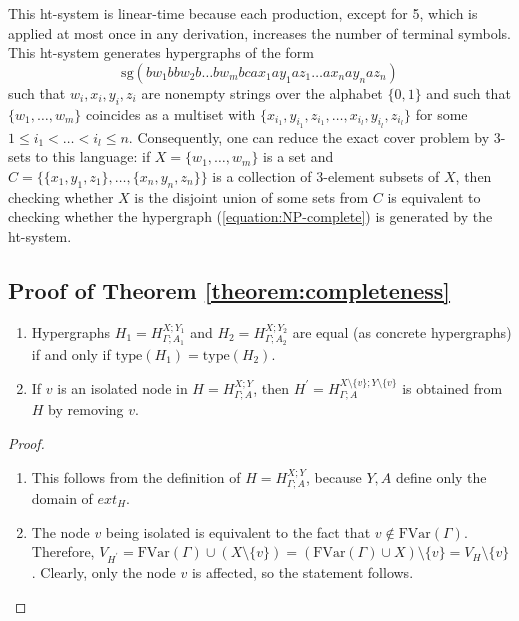 \documentclass[a4paper,UKenglish,cleveref, autoref, thm-restate,pdfa]{lipics-v2021}
\newcommand{\ext}{\mathit{ext}}
\newcommand{\type}{\mathrm{type}}
\newcommand{\SG}{\mathrm{sg}}
\newcommand{\FVar}{\mathrm{FVar}}
\begin{document}
	This ht-system is linear-time because each production, except for 5, which is applied at most once in any derivation, increases the number of terminal symbols. This ht-system generates hypergraphs of the form
	\begin{equation}\label{equation:NP-complete}
		\SG(bw_1b bw_2b \ldots bw_m b c a x_1 a y_1 a z_1 \ldots a x_n a y_n a z_n)
	\end{equation}
	such that $w_i,x_i,y_i,z_i$ are nonempty strings over the alphabet $\{0,1\}$ and such that $\{w_1,\ldots,w_m\}$ coincides as a multiset with $\{x_{i_1},y_{i_1},z_{i_1},\ldots,x_{i_l},y_{i_l},z_{i_l}\}$ for some $1 \le i_1 < \ldots < i_l \le n$. Consequently, one can reduce the exact cover problem by 3-sets to this language: if $X=\{w_1,\ldots,w_{m}\}$ is a set and $C = \{\{x_1,y_1,z_1\},\ldots,\{x_n,y_n,z_n\}\}$ is a collection of 3-element subsets of $X$, then checking whether $X$ is the disjoint union of some sets from $C$ is equivalent to checking whether the hypergraph (\ref{equation:NP-complete}) is generated by the ht-system.

\subsection{Proof of Theorem \ref{theorem:completeness}}\label{appendix:proof-theorem:completeness}

\begin{lemma}\label{lemma:properties-HXYGA}
	\leavevmode
	\begin{enumerate}
		\item Hypergraphs $H_1 = H^{X;Y_1}_{\Gamma;A_1}$ and $H_2 = H^{X;Y_2}_{\Gamma;A_2}$ are equal (as concrete hypergraphs) if and only if $\type(H_1) = \type(H_2)$.
		\item If $v$ is an isolated node in $H = H^{X;Y}_{\Gamma;A}$, then $H^\prime = H^{X\setminus\{v\};Y\setminus\{v\}}_{\Gamma;A}$ is obtained from $H$ by removing $v$.
	\end{enumerate}
\end{lemma}
\begin{proof}
	\begin{enumerate}
		\item This follows from the definition of $H = H^{X;Y}_{\Gamma;A}$, because $Y,A$ define only the domain of $\ext_H$.
		\item The node $v$ being isolated is equivalent to the fact that $v \notin \FVar(\Gamma)$. Therefore, $V_{H^\prime} = \FVar(\Gamma) \cup (X\setminus\{v\}) =  (\FVar(\Gamma) \cup X) \setminus \{v\} = V_H \setminus\{v\}$. Clearly, only the node $v$ is affected, so the statement follows.
	\end{enumerate}
	
\end{proof}
\end{document}
